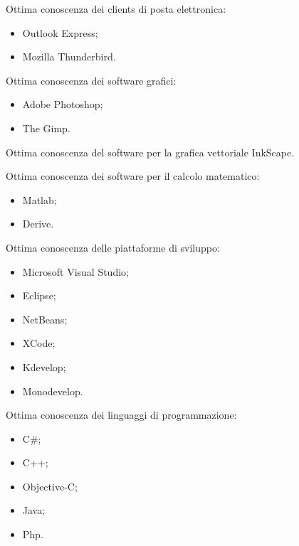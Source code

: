 \documentclass[totpages,helvetica,openbib,italian]{europecv}
\begin{document}
\begin{europecv}
{\begin{minipage}[t]{1\linewidth}
Ottima conoscenza dei clients di posta elettronica:
\begin{itemize}
\vspace{-3mm}\item[]Outlook Express;
\vspace{-3mm}\item[]Mozilla Thunderbird.
\end{itemize}

Ottima conoscenza dei software grafici:
\begin{itemize}
\vspace{-3mm}\item[] Adobe Photoshop;
\vspace{-3mm}\item[]The Gimp.

\end{itemize}

Ottima conoscenza del software per la grafica vettoriale InkScape.\\
\vspace{1mm}

Ottima conoscenza dei software per il calcolo matematico:
\begin{itemize}
\vspace{-3mm}\item[]Matlab;
\vspace{-3mm}\item[]Derive.
\end{itemize}


Ottima conoscenza delle piattaforme di sviluppo:
\begin{itemize}
\vspace{-3mm}\item[]Microsoft Visual Studio;
\vspace{-3mm}\item[]Eclipse;
\vspace{-3mm}\item[]NetBeans;
\vspace{-3mm}\item[]XCode;
\vspace{-3mm}\item[]Kdevelop;
\vspace{-3mm}\item[]Monodevelop.
\end{itemize}

Ottima conoscenza dei linguaggi di programmazione:
\begin{itemize}
\vspace{-3mm}\item[]C\#;
\vspace{-3mm}\item[]C++;
\vspace{-3mm}\item[]Objective-C;
\vspace{-3mm}\item[]Java;
\vspace{-3mm}\item[]Php.
\end{itemize}


\end{minipage}}
\end{europecv}
\end{document}
